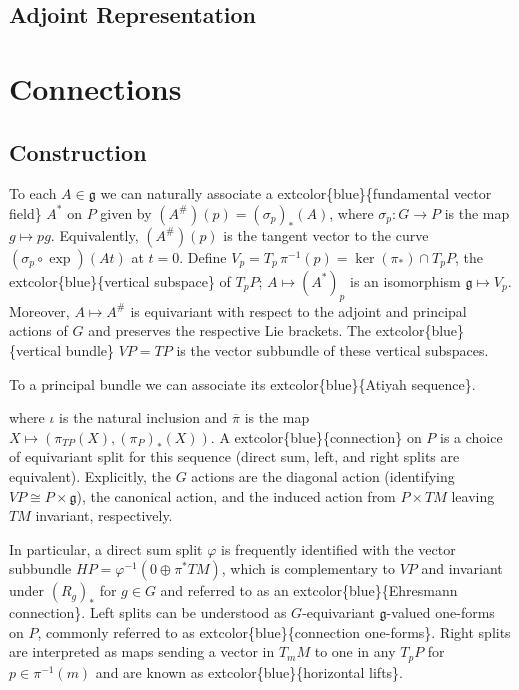 \documentclass[
]{book}
\begin{document}
\hypertarget{adjoint-representation}{%
\section{Adjoint Representation}\label{adjoint-representation}}

\hypertarget{connections}{%
\chapter{Connections}\label{connections}}

\hypertarget{construction-2}{%
\section{Construction}\label{construction-2}}

To each \(A \in \mathfrak{g}\) we can naturally associate a extcolor\{blue\}\{fundamental vector field\} \(A^*\) on \(P\) given by \((A^\#)(p) = (\sigma_p)_*(A)\), where \(\sigma_p : G \to P\) is the map \(g \mapsto pg\).
Equivalently, \((A^\#)(p)\) is the tangent vector to the curve \((\sigma_p \circ \exp)(At)\) at \(t = 0\).
Define \(V_p = T_p \, \pi^{-1}(p) = \ker(\pi_*) \cap T_p P\), the extcolor\{blue\}\{vertical subspace\} of \(T_p P\); \(A \mapsto (A^*)_p\) is an isomorphism \(\mathfrak{g} \mapsto V_p\).
Moreover, \(A \mapsto A^\#\) is equivariant with respect to the adjoint and principal actions of \(G\) and preserves the respective Lie brackets.
The extcolor\{blue\}\{vertical bundle\} \(VP = TP\) is the vector subbundle of these vertical subspaces.

To a principal bundle we can associate its extcolor\{blue\}\{Atiyah sequence\}.

where \(\iota\) is the natural inclusion and \(\overline{\pi}\) is the map \(X \mapsto (\pi_{TP}(X), (\pi_P)_*(X))\).
A extcolor\{blue\}\{connection\} on \(P\) is a choice of equivariant split for this sequence (direct sum, left, and right splits are equivalent).
Explicitly, the \(G\) actions are the diagonal action (identifying \(VP \cong P \times \mathfrak{g}\)), the canonical action, and the induced action from \(P \times TM\) leaving \(TM\) invariant, respectively.

In particular, a direct sum split \(\varphi\) is frequently identified with the vector subbundle \(HP = \varphi^{-1}(0 \oplus \pi^* TM)\), which is complementary to \(VP\) and invariant under \((R_g)_*\) for \(g \in G\) and referred to as an extcolor\{blue\}\{Ehresmann connection\}.
Left splits can be understood as \(G\)-equivariant \(\mathfrak{g}\)-valued one-forms on \(P\), commonly referred to as extcolor\{blue\}\{connection one-forms\}.
Right splits are interpreted as maps sending a vector in \(T_m M\) to one in any \(T_p P\) for \(p \in \pi^{-1}(m)\) and are known as extcolor\{blue\}\{horizontal lifts\}.
\end{document}
